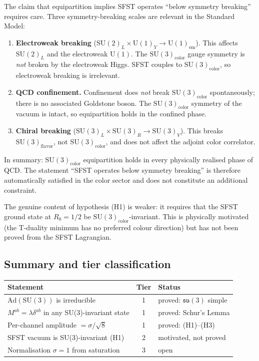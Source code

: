 The claim that equipartition implies SFST operates ``below symmetry
breaking'' requires care.  Three symmetry-breaking scales are relevant
in the Standard Model:
\begin{enumerate}[label=(\alph*)]
  \item \textbf{Electroweak breaking}
    ($\mathrm{SU}(2)_L\times\mathrm{U}(1)_Y\to\mathrm{U}(1)_{\mathrm{em}}$).
    This affects $\mathrm{SU}(2)_L$ and the electroweak $\mathrm{U}(1)$.
    The $\mathrm{SU}(3)_{\mathrm{color}}$ gauge symmetry is
    \emph{not} broken by the electroweak Higgs.
    SFST couples to $\mathrm{SU}(3)_{\mathrm{color}}$, so electroweak
    breaking is irrelevant.
  \item \textbf{QCD confinement.}  Confinement does \emph{not} break
    $\mathrm{SU}(3)_{\mathrm{color}}$ spontaneously; there is no
    associated Goldstone boson.  The $\mathrm{SU}(3)_{\mathrm{color}}$
    symmetry of the vacuum is intact, so equipartition holds in the
    confined phase.
  \item \textbf{Chiral breaking}
    ($\mathrm{SU}(3)_L\times\mathrm{SU}(3)_R\to\mathrm{SU}(3)_V$).
    This breaks $\mathrm{SU}(3)_{\mathrm{flavor}}$, not
    $\mathrm{SU}(3)_{\mathrm{color}}$, and does not affect the
    adjoint color correlator.
\end{enumerate}
In summary: $\mathrm{SU}(3)_{\mathrm{color}}$ equipartition holds in
every physically realised phase of QCD.  The statement ``SFST operates
below symmetry breaking'' is therefore automatically satisfied in the
color sector and does not constitute an additional constraint.

The genuine content of hypothesis (H1) is weaker: it requires that the
SFST ground state at $R_0=1/2$ be $\mathrm{SU}(3)_{\mathrm{color}}$-invariant.
This is physically motivated (the T-duality minimum has no preferred colour
direction) but has not been proved from the SFST Lagrangian.

\subsection{Summary and tier classification}

\begin{center}
\renewcommand{\arraystretch}{1.3}
\begin{tabular}{p{}cp{}}
\toprule
Statement & Tier & Status \\
\midrule
$\mathrm{Ad}(\mathrm{SU}(3))$ is irreducible &
  1 & proved: $\mathfrak{su}(3)$ simple \\
$M^{ab}=\lambda\delta^{ab}$ in any SU(3)-invariant state &
  1 & proved: Schur's Lemma \\
Per-channel amplitude $= \sigma/\sqrt{8}$ &
  1 & proved: (H1)--(H3) \\
SFST vacuum is SU(3)-invariant (H1) &
  2 & motivated, not proved \\
Normalisation $\sigma=1$ from saturation &
  3 & open \\
\bottomrule
\end{tabular}
\end{center}

